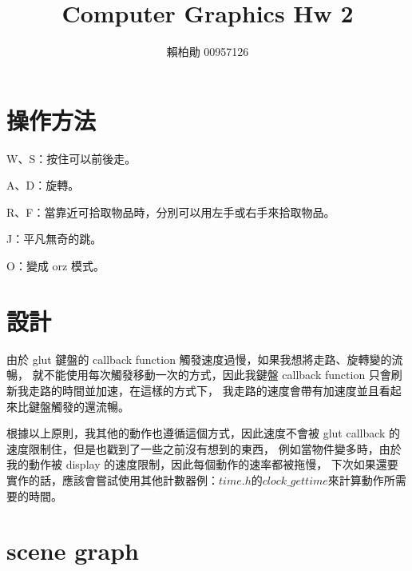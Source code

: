 \documentclass[a4,12pt]{article}
\title{Computer Graphics Hw 2}
\author{賴柏勛 00957126}
\begin{document}
    \maketitle
    \section{操作方法}

    W、S：按住可以前後走。

    A、D：旋轉。

    R、F：當靠近可拾取物品時，分別可以用左手或右手來拾取物品。
    
    J：平凡無奇的跳。

    O：變成 orz 模式。
    \section{設計}
        由於 glut 鍵盤的 callback function 觸發速度過慢，如果我想將走路、旋轉變的流暢，
        就不能使用每次觸發移動一次的方式，因此我鍵盤 callback function 只會刷新我走路的時間並加速，在這樣的方式下，
        我走路的速度會帶有加速度並且看起來比鍵盤觸發的還流暢。

        根據以上原則，我其他的動作也遵循這個方式，因此速度不會被 glut callback 的速度限制住，但是也戳到了一些之前沒有想到的東西，
        例如當物件變多時，由於我的動作被 display 的速度限制，因此每個動作的速率都被拖慢，
        下次如果還要實作的話，應該會嘗試使用其他計數器\(例：time.h 的  clock\_gettime\)來計算動作所需要的時間。
        
    \section{scene graph}   
\end{document}
